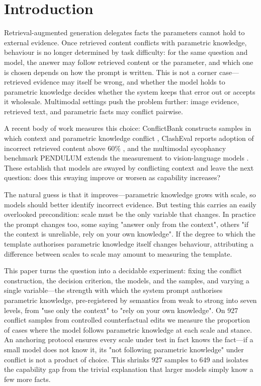 \documentclass[pdflatex,sn-basic,Numbered]{sn-jnl}
\theoremstyle{thmstyleone}
\theoremstyle{thmstyletwo}
\theoremstyle{thmstylethree}
\begin{document}
\maketitle


\section{Introduction}\label{sec:1}

Retrieval-augmented generation delegates facts the parameters cannot hold to external evidence. Once retrieved content conflicts with parametric knowledge, behaviour is no longer determined by task difficulty: for the same question and model, the answer may follow retrieved content or the parameter, and which one is chosen depends on how the prompt is written. This is not a corner case—retrieved evidence may itself be wrong, and whether the model holds to parametric knowledge decides whether the system keeps that error out or accepts it wholesale. Multimodal settings push the problem further: image evidence, retrieved text, and parametric facts may conflict pairwise.

A recent body of work measures this choice: ConflictBank constructs samples in which context and parametric knowledge conflict \cite{ref1}, ClashEval reports adoption of incorrect retrieved content above 60\% \cite{ref2}, and the multimodal sycophancy benchmark PENDULUM extends the measurement to vision-language models \cite{ref3}. These establish that models are swayed by conflicting context and leave the next question: does this swaying improve or worsen as capability increases?

The natural guess is that it improves—parametric knowledge grows with scale, so models should better identify incorrect evidence. But testing this carries an easily overlooked precondition: scale must be the only variable that changes. In practice the prompt changes too, some saying "answer only from the context", others "if the context is unreliable, rely on your own knowledge". If the degree to which the template authorises parametric knowledge itself changes behaviour, attributing a difference between scales to scale may amount to measuring the template.

This paper turns the question into a decidable experiment: fixing the conflict construction, the decision criterion, the models, and the samples, and varying a single variable—the strength with which the system prompt authorises parametric knowledge, pre-registered by semantics from weak to strong into seven levels, from "use only the context" to "rely on your own knowledge". On 927 conflict samples from controlled counterfactual edits we measure the proportion of cases where the model follows parametric knowledge at each scale and stance. An anchoring protocol ensures every scale under test in fact knows the fact—if a small model does not know it, its "not following parametric knowledge" under conflict is not a product of choice. This shrinks 927 samples to 649 and isolates the capability gap from the trivial explanation that larger models simply know a few more facts.
\end{document}
